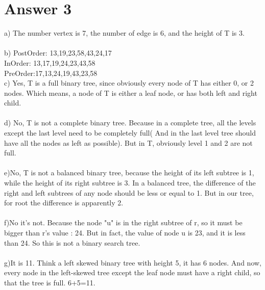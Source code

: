 \documentclass[12pt]{article}
\begin{document}
\section*{Answer 3}
a) The number vertex is 7, the number of edge is 6, and the height of T is 3.
\\\\
b)
PostOrder: 13,19,23,58,43,24,17\\
InOrder: 13,17,19,24,23,43,58
\\
PreOrder:17,13,24,19,43,23,58
\\
c) Yes, T is a full binary tree, since obviously every node of T has either 0, or 2 nodes. Which means, a node of T is either a leaf node, or has both left and right child.
\\\\
d) No, T is not a complete binary tree. Because in a complete tree, all the levels except the last level need to be completely full( And in the last level tree should have all the nodes as left as possible). But in T, obviously level 1 and 2 are not full.
\\\\
e)No, T is not a balanced binary tree, because the height of its left subtree is 1, while the height of its right subtree is 3. In a balanced tree, the difference of the right and left subtrees of any node should be less or equal to 1. But in our tree, for root the difference is apparently 2.
\\\\
f)No it's not. Because the node "u" is in the right subtree of r, so it must be bigger than r's value : 24. But in fact, the value of node u is 23, and it is less than 24. So this is not a binary search tree.
\\\\
g)It is 11. Think a left skewed binary tree with height 5, it has 6 nodes. And now, every node in the left-skewed tree except the leaf node must have a right child, so that the tree is full. 6+5=11.
\\\\
\end{document}
